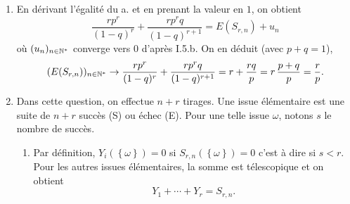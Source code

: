 \begin{enumerate}
\begin{enumerate}
    \item La formule précédente est valable pour tous les $x\in \left[ 0 , 1\right[$. Comme $0 < q < p$, on peut remplacer $x$ par $qx$ avec $x \in \left[ 0, 1 \right]$:
\[
\frac{1}{(1-x)^r} =
 \sum_{k = r}^{n +r} \binom{k-1}{r - 1} (qx)^{k-r} + R_{r,n}(qx).
\]
Multiplions par $p^r x^r$ pour faire apparaitre le $\p\left( S_{r,n} =k\right) = \binom{k-1}{r-1}p^r q^{k-r}$ et disparaitre le $x^k$ au dénominateur
\[
\frac{p^r x^r}{(1-x)^r} = \sum_{k = r}^{n +r} \underset{ = \p\left( S_{r,n} =k\right)}{\underbrace{\binom{k-1}{r - 1} p^r q^{k-r}}} x^k + p^r x^r R_{r,n}(qx). 
\]
En prenant la valeur en $1$, comme $1-q = p$, on obtient :
\begin{multline*}
1 = \sum_{k = r}^{n +r} \p\left( S_{r,n} =k\right) + p^r R_{r,n}(qx)\\
\text{ avec }
\sum_{k = r}^{n +r} \p\left( S_{r,n} =k\right) = \p\left( S_{r,n} > 0\right) = 1 - \p\left( S_{r,n} = 0\right) \\
\Rightarrow \p\left( S_{r,n} = 0\right) = p^r R_{r,n}(qx).
\end{multline*}
  \end{enumerate}

  \item En dérivant l'égalité du a. et en prenant la valeur en $1$, on obtient
\[
  \frac{rp^r}{(1-q)^r} + \frac{rp^rq}{(1-q)^{r+1}} = E(S_{r,n}) + u_n
\]
où $(u_n)_{n\in \mathbb{N}^*}$ converge vers $0$ d'après I.5.b. On en déduit (avec $p+q = 1$),
\[
  (E(S_{r,n}))_{n\in \mathbb{N}^*} \rightarrow \frac{rp^r}{(1-q)^r} + \frac{rp^rq}{(1-q)^{r+1}}
  = r + \frac{rq}{p} = r\,\frac{p+q}{p} = \frac{r}{p}.
\]

  \item Dans cette question, on effectue $n+r$ tirages. Une issue élémentaire est une suite de $n+r$ succès (S) ou échec (E). Pour une telle issue $\omega$, notons $s$ le nombre de succès.
  \begin{enumerate}
    \item Par définition, $Y_i(\left\lbrace \omega\right\rbrace) = 0$ si $S_{r,n}(\left\lbrace \omega\right\rbrace) = 0$ c'est à dire si $s < r$. Pour les autres issues élémentaires, la somme est télescopique et on obtient
\[
  Y_1 + \cdots + Y_r = S_{r,n}.
\]


\end{enumerate}
\end{enumerate}
